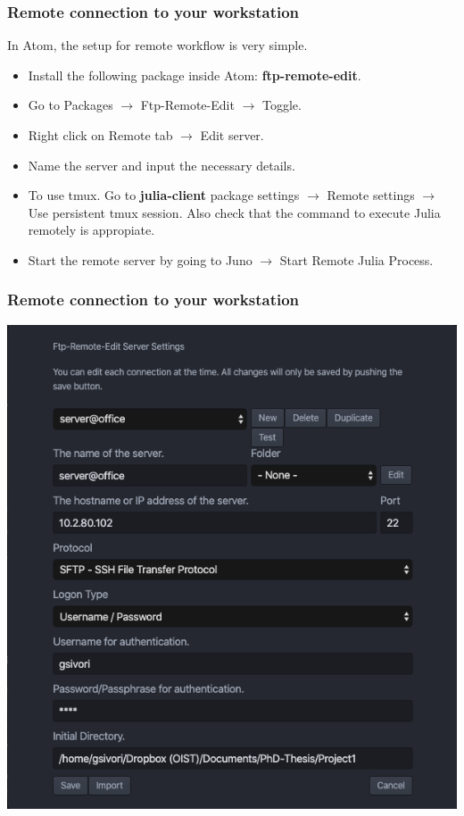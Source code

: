 \documentclass{beamer}
\begin{document}
\begin{frame}
\frametitle{Remote connection to your workstation}
In Atom, the setup for remote workflow is very simple. 
\begin{itemize}
\item Install the following package inside Atom: \textbf{ftp-remote-edit}.
\item Go to Packages $\rightarrow$ Ftp-Remote-Edit $\rightarrow$ Toggle.
\item Right click on Remote tab $\rightarrow$ Edit server.
\item Name the server and input the necessary details.
\item To use tmux. Go to \textbf{julia-client} package settings $\rightarrow$ Remote settings $\rightarrow$ Use persistent tmux session. Also check that the command to execute Julia remotely is appropiate.
\item Start the remote server by going to Juno $\rightarrow$ Start Remote Julia Process.
\end{itemize}
\end{frame}

\begin{frame}
\frametitle{Remote connection to your workstation}
\centering
\includegraphics[width=0.55\paperwidth]{ftp-server-settings.png}
\end{frame}
\end{document}
